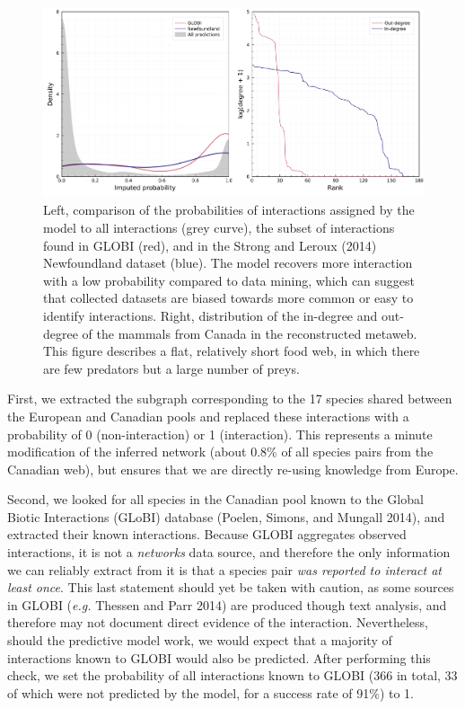 \documentclass[10pt,oneside]{article}
\makeatletter
\def\maxwidth{\ifdim\Gin@nat@width>\linewidth\linewidth
\else\Gin@nat@width\fi}
\let\Oldincludegraphics\includegraphics
\renewcommand{\includegraphics}[1]{\Oldincludegraphics[width=\maxwidth]{#1}}
\makeatother
\begin{document}
\begin{figure}
\hypertarget{fig:inflation}{%
\centering
\includegraphics{figures/figure-validation.png}
\caption{Left, comparison of the probabilities of interactions assigned
by the model to all interactions (grey curve), the subset of
interactions found in GLOBI (red), and in the Strong and Leroux (2014)
Newfoundland dataset (blue). The model recovers more interaction with a
low probability compared to data mining, which can suggest that
collected datasets are biased towards more common or easy to identify
interactions. Right, distribution of the in-degree and out-degree of the
mammals from Canada in the reconstructed metaweb. This figure describes
a flat, relatively short food web, in which there are few predators but
a large number of preys.}\label{fig:inflation}
}
\end{figure}

First, we extracted the subgraph corresponding to the 17 species shared
between the European and Canadian pools and replaced these interactions
with a probability of 0 (non-interaction) or 1 (interaction). This
represents a minute modification of the inferred network (about 0.8\% of
all species pairs from the Canadian web), but ensures that we are
directly re-using knowledge from Europe.

Second, we looked for all species in the Canadian pool known to the
Global Biotic Interactions (GLoBI) database (Poelen, Simons, and Mungall
2014), and extracted their known interactions. Because GLOBI aggregates
observed interactions, it is not a \emph{networks} data source, and
therefore the only information we can reliably extract from it is that a
species pair \emph{was reported to interact at least once}. This last
statement should yet be taken with caution, as some sources in GLOBI
(\emph{e.g.} Thessen and Parr 2014) are produced though text analysis,
and therefore may not document direct evidence of the interaction.
Nevertheless, should the predictive model work, we would expect that a
majority of interactions known to GLOBI would also be predicted. After
performing this check, we set the probability of all interactions known
to GLOBI (366 in total, 33 of which were not predicted by the model, for
a success rate of 91\%) to 1.
\end{document}
